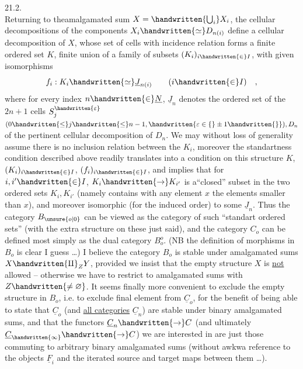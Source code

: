 
\hfill 21.2.\\

 Returning to theamalgamated sum $X=\handwritten{\bigcup_i}X_i$, the cellular decompositions of the components $X_i\handwritten{\simeq}D_{n(i)}$ define a cellular decomposition of $X$, whose set of cells with incidence relation forms a finite ordered set $K$, finite union of a family of subsets $(K_i)_{i\handwritten{\in}I}$, with given isomorphisms
\[
f_i:K_i\handwritten{\simeq}\underline{J}_{n(i)}\qquad(i\handwritten{\in}I)\quad ,
\]
where for every index $n\handwritten{\in}\underline{N}$, $\underline{J}_n$ denotes the ordered set of the $2n+1$ cells $S_j^{\handwritten{\varepsilon}}$ $(0\handwritten{\leq}j\handwritten{\leq}n-1,\handwritten{\varepsilon\in\{}\pm1\handwritten{\}}),D_n$ of the pertinent cellular decomposition of $D_n$. We may without loss of generality assume there is no inclusion relation between the $K_i$, moreover the standartness condition described above readily translates into a condition on this structure $K$, $(K_i)_{i\handwritten{\in}I}$, $(f_i)_{i\handwritten{\in}I}$, and implies that for $i,i'\handwritten{\in}I$, $K_i\handwritten{\to}K_{i'}$ is a``closed'' subset in the two ordered sets $K_i,K_{i'}$ (namely contains with any element $x$ the elements smaller than $x$), and moreover isomorphic (for the induced order) to some $\underline{J}_n$. Thus the category $B_{\unsure{o|0}}$  can be viewed as the category of such ``standart ordered sets'' (with the extra structure on these just said), and the category $C_o$ can be defined most simply as the dual category $B_o^{o}$. (NB the definition of morphisms in $B_o$ is clear I guess \ldots) I believe the category $B_o$ is stable under amalgamated sums $X\handwritten{\amalg}_ZY$, provided  we insist that the empty structure $X$ is \uline{not} allowed -- otherwise we have to  restrict to amalgamated sums with $Z\handwritten{\ne\varnothing}$. It seems finally more convenient to exclude the empty structure in $B_o$, i.e. to exclude final element from $\underline{C}_o$, for the benefit of being able to state that $\underline{C}_o$ (and \uline{all categories} $\underline{C}_n$\handwritten{*})  are stable under binary amalgamated sums, and that the functors $\underline{C}_n\handwritten{\to}C$ (and ultimately $\underline{C}_{\handwritten{\infty}}\handwritten{\to}C$) we are interested in are just those commuting to arbitrary binary amalgamated sums (without  awkwa reference to the objects $\underline{F}_i$ and the iterated source and target maps between them \ldots).

